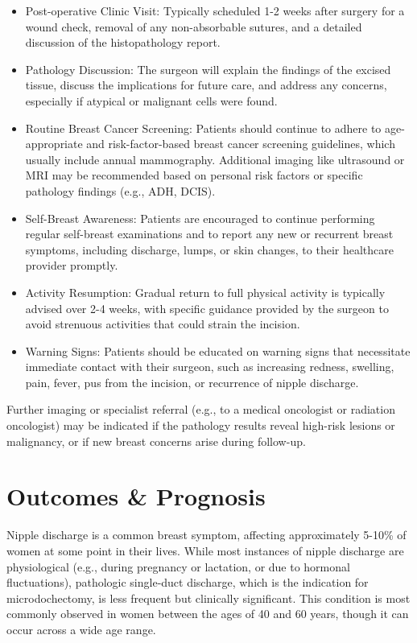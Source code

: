\begin{itemize}
  \item Post-operative Clinic Visit: Typically scheduled 1-2 weeks after surgery for a wound check, removal of any non-absorbable sutures, and a detailed discussion of the histopathology report.
  \item Pathology Discussion: The surgeon will explain the findings of the excised tissue, discuss the implications for future care, and address any concerns, especially if atypical or malignant cells were found.
  \item Routine Breast Cancer Screening: Patients should continue to adhere to age-appropriate and risk-factor-based breast cancer screening guidelines, which usually include annual mammography. Additional imaging like ultrasound or MRI may be recommended based on personal risk factors or specific pathology findings (e.g., ADH, DCIS).
  \item Self-Breast Awareness: Patients are encouraged to continue performing regular self-breast examinations and to report any new or recurrent breast symptoms, including discharge, lumps, or skin changes, to their healthcare provider promptly.
  \item Activity Resumption: Gradual return to full physical activity is typically advised over 2-4 weeks, with specific guidance provided by the surgeon to avoid strenuous activities that could strain the incision.
  \item Warning Signs: Patients should be educated on warning signs that necessitate immediate contact with their surgeon, such as increasing redness, swelling, pain, fever, pus from the incision, or recurrence of nipple discharge.
\end{itemize}

Further imaging or specialist referral (e.g., to a medical oncologist or radiation oncologist) may be indicated if the pathology results reveal high-risk lesions or malignancy, or if new breast concerns arise during follow-up.

\section*{Outcomes \& Prognosis}
Nipple discharge is a common breast symptom, affecting approximately 5-10\% of women at some point in their lives. While most instances of nipple discharge are physiological (e.g., during pregnancy or lactation, or due to hormonal fluctuations), pathologic single-duct discharge, which is the indication for microdochectomy, is less frequent but clinically significant. This condition is most commonly observed in women between the ages of 40 and 60 years, though it can occur across a wide age range. 

